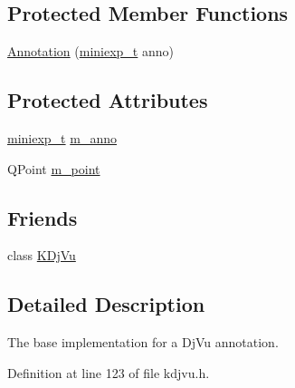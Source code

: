 \subsection*{Protected Member Functions}
\begin{DoxyCompactItemize}
\item 
\hyperlink{classKDjVu_1_1Annotation_a9a57f9591f4fbea73ba4e1c6bd55efc8}{Annotation} (\hyperlink{kdjvu_8h_a58955b1a7edfc6e6ccb48402f744802b}{miniexp\+\_\+t} anno)
\end{DoxyCompactItemize}
\subsection*{Protected Attributes}
\begin{DoxyCompactItemize}
\item 
\hyperlink{kdjvu_8h_a58955b1a7edfc6e6ccb48402f744802b}{miniexp\+\_\+t} \hyperlink{classKDjVu_1_1Annotation_a7334ba00c896becbe9630c5f2e1bbd28}{m\+\_\+anno}
\item 
Q\+Point \hyperlink{classKDjVu_1_1Annotation_af406a7ca02accb64486f23888197c2cb}{m\+\_\+point}
\end{DoxyCompactItemize}
\subsection*{Friends}
\begin{DoxyCompactItemize}
\item 
class \hyperlink{classKDjVu_1_1Annotation_a4241ce0336d22245ffdb13dd5cb6edcc}{K\+Dj\+Vu}
\end{DoxyCompactItemize}


\subsection{Detailed Description}
The base implementation for a Dj\+Vu annotation. 

Definition at line 123 of file kdjvu.\+h.



